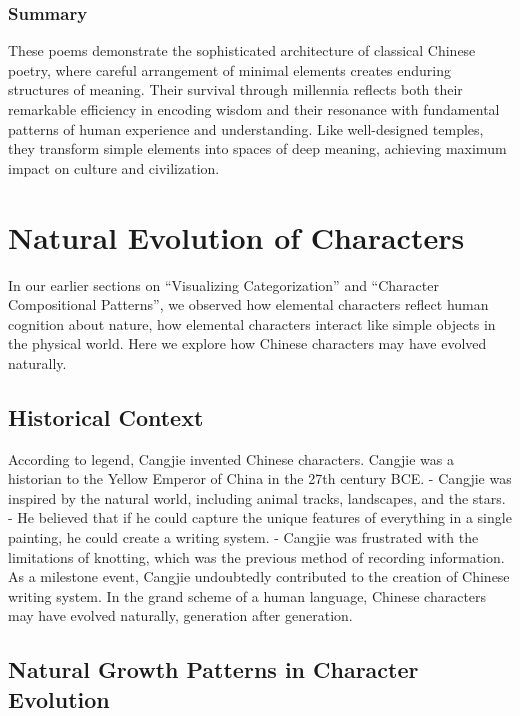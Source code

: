 \documentclass[11pt,letterpaper]{article}
\begin{document}
\subsubsection{Summary}\label{summary}

These poems demonstrate the sophisticated architecture of classical
Chinese poetry, where careful arrangement of minimal elements creates
enduring structures of meaning. Their survival through millennia
reflects both their remarkable efficiency in encoding wisdom and their
resonance with fundamental patterns of human experience and
understanding. Like well-designed temples, they transform simple
elements into spaces of deep meaning, achieving maximum impact on
culture and civilization.

\section{Natural Evolution of Characters}\label{natural-evolution-of-characters}

In our earlier sections on ``Visualizing Categorization'' and
``Character Compositional Patterns'', we observed how elemental
characters reflect human cognition about nature, how elemental
characters interact like simple objects in the physical world. Here we
explore how Chinese characters may have evolved naturally.

\subsection{Historical Context}\label{historical-context}

According to legend, Cangjie invented Chinese characters. Cangjie was a
historian to the Yellow Emperor of China in the 27th century BCE. -
Cangjie was inspired by the natural world, including animal tracks,
landscapes, and the stars. - He believed that if he could capture the
unique features of everything in a single painting, he could create a
writing system. - Cangjie was frustrated with the limitations of
knotting, which was the previous method of recording information. As a
milestone event, Cangjie undoubtedly contributed to the creation of
Chinese writing system. In the grand scheme of a human language, Chinese
characters may have evolved naturally, generation after generation.

\subsection{Natural Growth Patterns in Character
Evolution}\label{natural-growth-patterns-in-character-evolution}
\end{document}

